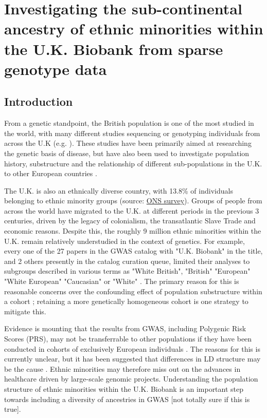 \chapter{Investigating the sub-continental ancestry of ethnic minorities within the U.K. Biobank from sparse genotype data}
\label{chapterlabel3}

\section{Introduction}

From a genetic standpoint, the British population is one of the most studied in the world, with many different studies sequencing or genotyping individuals from across the U.K (e.g. \cite{bycroft2018UK, Leslie2015, turnbull2018introducing, UK10k2015UK10k}). These studies have been primarily aimed at researching the genetic basis of disease, but have also been used to investigate population history, substructure  and the relationship of different sub-populations in the U.K. to other European countries \cite{Leslie2015, schiffels2016iron, liu2020human}.  

The U.K. is also an ethnically diverse country, with 13.8\% of individuals belonging to ethnic minority groups (source: \href{https://www.ons.gov.U.K./peoplepopulationandcommunity/populationandmigration/populationestimates/articles/researchreportonpopulationestimatesbyethnicgroupandreligion/2019-12-04}{ONS survey}). Groups of people from across the world have migrated to the U.K. at different periods in the previous 3 centuries, driven by the legacy of colonialism, the transatlantic Slave Trade and economic reasons. Despite this, the roughly 9 million ethnic minorities within the U.K. remain relatively understudied in the context of genetics. For example, every one of the 27 papers in the GWAS catalog with "U.K. Biobank" in the title, and 2 others presently in the catalog curation queue, limited their analyses to subgroups described in various terms as "White British", "British" "European" "White European" "Caucasian" or "White" \cite{manolio2019using}. The primary reason for this is reasonable concerns over the confounding effect of population substructure within a cohort \cite{hellwege2017population}; retaining a more genetically homogeneous cohort is one strategy to mitigate this. 

Evidence is mounting that the results from GWAS, including Polygenic Risk Scores (PRS), may not be transferrable to other populations if they have been conducted in cohorts of exclusively European individuals \cite{kuchenbaecker2019transferability, martin2017human, bustamante2011genomics}. The reasons for this is currently unclear, but it has been suggested that differences in LD structure may be the cause \cite{vilhjalmsson2015modeling}. Ethnic minorities may therefore miss out on the advances in healthcare driven by large-scale genomic projects. Understanding the population structure of ethnic minorities within the U.K. Biobank is an important step towards including a diversity of ancestries in GWAS [not totally sure if this is true]. 


